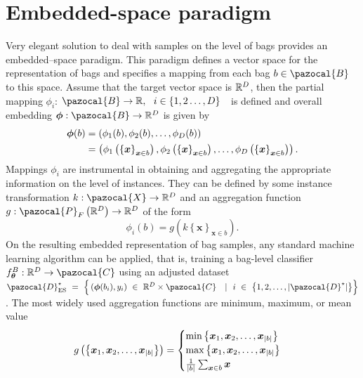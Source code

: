 \section{Embedded-space paradigm}
Very elegant solution to deal with samples on the level of bags provides an embedded--space paradigm\cite{mandlik}. This paradigm defines a vector space for the representation of bags and specifies a mapping from each bag $b\in \pazocal{B}$ to this space. Assume that the target vector space is $\mathbb{R}^D$, then the partial mapping $\phi_i$: $\pazocal{B} \to \R,~~ i\in\left\lbrace1,2\dots, D\right\rbrace$~~is defined and overall embedding $\boldsymbol{\phi}: \pazocal{B} \to \R^D $ is given by
\begin{align}
	\boldsymbol{\phi}(b) &= \left(\phi_1(b), \phi_2(b), \dots, \phi_D(b)\right)\\
	&= \left(\phi_1\left(\left\lbrace \boldsymbol{x} \right\rbrace_{\boldsymbol{x} \in b}\right), \phi_2\left(\left\lbrace \boldsymbol{x} \right\rbrace_{\boldsymbol{x} \in b}\right), \dots, \phi_D\left(\left\lbrace \boldsymbol{x} \right\rbrace_{\boldsymbol{x} \in b}\right)\right).
\end{align}
Mappings $\phi_i$ are instrumental in obtaining and aggregating the appropriate information on the level of instances. They can be defined by some instance transformation $k:\pazocal{X}\to \R^D$ and an aggregation function $g:\pazocal{P}_F\left(\R^D\right) \to \R^D$ of the form 
\begin{equation}
	\phi_i(b)=g\left( k\left\lbrace\boldsymbol{x}\right\rbrace_{\boldsymbol{x} \in b}\right).
\end{equation}
On the resulting embedded representation of bag samples, any standard machine learning algorithm can be applied, that is, training a bag-level classifier $f_{\boldsymbol{\theta}}^B :\R^D \to \pazocal{C}$ using an adjusted dataset $\pazocal{D}^\star_{\mathrm{ES}}~=~\Big\lbrace \left(\boldsymbol{\phi}(b_i), y_i\right)~\in~\R^D\times\pazocal{C}~\ ~|~\ i~\in~\big\lbrace 1,2,\dots,\vert \pazocal{D}^\star\vert\big\rbrace\Big\rbrace$. The most widely used aggregation functions are minimum, maximum, or mean value
\begin{equation}
    g\left(\left\lbrace \boldsymbol{x}_1,\boldsymbol{x}_2,\dots,\boldsymbol{x}_{\vert b \vert} \right\rbrace \right) = \begin{cases}
	 \min \left\lbrace \boldsymbol{x}_1,\boldsymbol{x}_2,\dots,\boldsymbol{x}_{\vert b \vert}\right\rbrace\\
	 \max  \left\lbrace \boldsymbol{x}_1,\boldsymbol{x}_2,\dots,\boldsymbol{x}_{\vert b \vert}\right\rbrace\\
	 \frac{1}{\vert b \vert}\sum_{\boldsymbol{x} \in b} \boldsymbol{x} \\
\end{cases}   
\end{equation}
